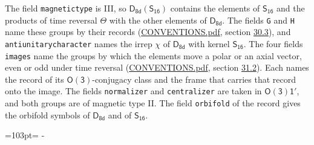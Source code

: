 \documentclass[10pt,a4paper]{article}
\newcommand{\needspace}[1]{\par\penalty-100\begingroup\dimen0=#1\relax\dimen2=\pagegoal
  \advance\dimen2-\pagetotal\ifdim\dimen0>\dimen2\relax\ifdim\dimen2>0pt\vfil\break\fi\fi
  \endgroup}
\numberwithin{equation}{section}
\newcommand{\grp}[1]{\mathsf{#1}}
\begin{document}
The field \texttt{magnetictype} is III, so $\grp{D_{8d}}(\grp{S_{16}})$ contains the elements of $\grp{S_{16}}$ and the products of time reversal $\varTheta$ with the other elements of $\grp{D_{8d}}$. The fields \texttt{G} and \texttt{H} name these groups by their records (\href{../../CONVENTIONS.pdf}{CONVENTIONS.pdf}, section \href{../../CONVENTIONS.pdf\#conv.30.3}{30.3}), and \texttt{antiunitarycharacter} names the irrep $\chi$ of $\grp{D_{8d}}$ with kernel $\grp{S_{16}}$. The four fields \texttt{images} name the groups by which the elements move a polar or an axial vector, even or odd under time reversal (\href{../../CONVENTIONS.pdf}{CONVENTIONS.pdf}, section \href{../../CONVENTIONS.pdf\#conv.31.2}{31.2}). Each names the record of its $\grp{O(3)}$-conjugacy class and the frame that carries that record onto the image. The fields \texttt{normalizer} and \texttt{centralizer} are taken in $\grp{O(3)1'}$, and both groups are of magnetic type II. The field \texttt{orbifold} of the record gives the orbifold symbols of $\grp{D_{8d}}$ and of $\grp{S_{16}}$.
\needspace{103pt}
\end{document}
